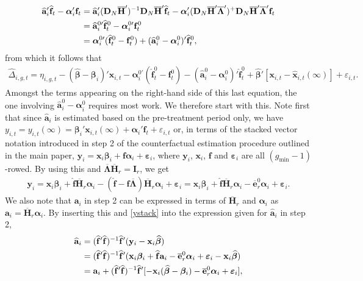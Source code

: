 \documentclass[12pt,fleqn]{article}
\def\*#1{\mathbf{#1}}
\def\+#1{\boldsymbol{#1}}
\begin{document}
\begin{align}
\widehat{\*a}_i'\widehat{\*f}_t - \+\alpha_i'\*f_t &= \widehat{\*a}_i'(\*{D}_N\overline{\*{H}}')^{-1}\*{D}_N\overline{\*{H}}'\widehat{\*f}_t - \+\alpha_i'(\mathbf{D}_N\overline{\mathbf{H}}'\overline{\boldsymbol{\Lambda}}')^+\mathbf{D}_N\overline{\mathbf{H}}'\overline{\boldsymbol{\Lambda}}'\*f_t \notag\\
& = \widehat{\*a}_i^{0\prime}\widehat{\*f}_t^0 - \+\alpha_i^{0\prime}\*f_t^0 \notag\\
& = \+\alpha_i^{0\prime}(\widehat{\*f}_t^0-\*f_t^0) + (\widehat{\*a}_i^{0} - \+\alpha_i^0)'\widehat{\*f}_t^0,
\end{align}
from which it follows that
\begin{align}
\widehat \Delta_{i,g,t}  = \eta_{i,g,t} - (\widehat{\+\beta} - \+\beta_i)'\*x_{i,t}  - \+\alpha_i^{0\prime}(\widehat{\*f}_t^0-\*f_t^0) - (\widehat{\*a}_i^{0} - \+\alpha_i^0)'\widehat{\*f}_t^0  + \widehat{\+\beta}'[\*x_{i,t} - \widehat{\*x}_{i,t}(\infty)] + \varepsilon_{i,t}.
\end{align}
Amongst the terms appearing on the right-hand side of this last equation, the one involving $\widehat{\*a}_i^0 - \+\alpha_i^0$ requires most work. We therefore start with this. Note first that since $\widehat{\*a}_i$ is estimated based on the pre-treatment period only, we have $y_{i,t} = y_{i,t}(\infty) = \+\beta_i'\*x_{i,t}(\infty) +  \+\alpha_i'\*f_t + \varepsilon_{i,t}$ or, in terms of the stacked vector notation introduced in step 2 of the counterfactual estimation procedure outlined in the main paper, $\*y_{i}= \*x_{i}\+\beta_i + \*f\+\alpha_i+  \+\varepsilon_{i}$, where $\*y_{i}$, $\*x_{i}$, $\*f$ and $\+\varepsilon_{i}$ are all $(g_{\min}-1)$-rowed. By using this and $\overline{\+\Lambda}\overline{\*H}_{r} = \*I_{r}$, we get
\begin{eqnarray}
\*y_{i}= \*x_{i}\+\beta_i + \widehat{\*f}\overline{\*H}_{r}\+\alpha_i - (\widehat{\*f} - \*f\overline{\+\Lambda})\overline{\*H}_{r}\+\alpha_i+  \+\varepsilon_{i}  = \*x_{i}\+\beta_i + \widehat{\*f} \overline{\*H}_{r}\+\alpha_i - \overline{\*e}_{r}^0\+\alpha_i +  \+\varepsilon_{i}. \label{ystack}
\end{eqnarray}
We also note that $\*a_i$ in step 2 can be expressed in terms of $\overline{\*H}_{r}$ and $\+\alpha_i$ as $\*a_i = \overline{\*H}_{r}\+\alpha_i$. By inserting this and \eqref{ystack} into the expression given for $\widehat{\*a}_i$ in step 2,
\begin{align}
\widehat{\*a}_i &= (\widehat{\*f}'\widehat{\*f})^{-1}\widehat{\*f}'(\*y_{i}-\*x_{i}\widehat{\+\beta}) \notag\\
& = (\widehat{\*f}'\widehat{\*f})^{-1}\widehat{\*f}'(\*x_{i}\+\beta_i + \widehat{\*f} \*a_i - \overline{\*e}_{r}^0\+\alpha_i +  \+\varepsilon_{i}-\*x_{i}\widehat{\+\beta}) \notag\\
& =  \*a_i + (\widehat{\*f}'\widehat{\*f})^{-1}\widehat{\*f}'[- \*x_{i}(\widehat{\+\beta}-\+\beta_i)  - \overline{\*e}_{r}^0\+\alpha_i +  \+\varepsilon_{i} ],
\end{align}
\end{document}
